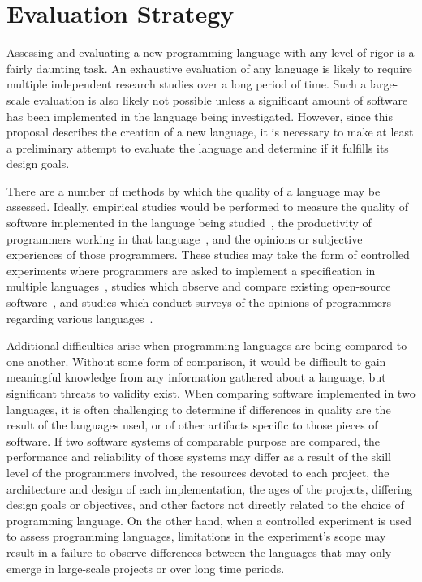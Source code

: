 \documentclass[11pt,draft]{article}
\theoremstyle{break}
\begin{document}
\vspace*{-.2in}
\section{Evaluation Strategy}
\label{sec:evaluate}
\vspace*{-.1in}

Assessing and evaluating a new programming language with any level of rigor is a fairly daunting task. An exhaustive evaluation of any language is likely to require multiple independent research studies over a long period of time. Such a large-scale evaluation is also likely not possible unless a significant amount of software has been implemented in the language being investigated. However, since this proposal describes the creation of a new language, it is necessary to make at least a preliminary attempt to evaluate the language and determine if it fulfills its design goals.

There are a number of methods by which the quality of a language may be assessed. Ideally, empirical studies would be performed to measure the quality of software implemented in the language being studied~\cite{Bhattacharya:2011:APL:1985793.1985817,Ray:2014:LSS:2635868.2635922}, the productivity of programmers working in that language~\cite{hudak1994haskell}, and the opinions or subjective experiences of those programmers. These studies may take the form of controlled experiments where programmers are asked to implement a specification in multiple languages~\cite{hudak1994haskell,Ray:2014:LSS:2635868.2635922}, studies which observe and compare existing open-source software~\cite{Ray:2014:LSS:2635868.2635922,Bhattacharya:2011:APL:1985793.1985817}, and studies which conduct surveys of the opinions of programmers regarding various languages~\cite{Ray:2014:LSS:2635868.2635922}.

Additional difficulties arise when programming languages are being compared to one another. Without some form of comparison, it would be difficult to gain meaningful knowledge from any information gathered about a language, but significant threats to validity exist. When comparing software implemented in two languages, it is often challenging to determine if differences in quality are the result of the languages used, or of other artifacts specific to those pieces of software. If two software systems of comparable purpose are compared, the performance and reliability of those systems may differ as a result of the skill level of the programmers involved, the resources devoted to each project, the architecture and design of each implementation, the ages of the projects, differing design goals or objectives, and other factors not directly related to the choice of programming language. On the other hand, when a controlled experiment is used to assess programming languages, limitations in the experiment's scope may result in a failure to observe differences between the languages that may only emerge in large-scale projects or over long time periods.
\end{document}
